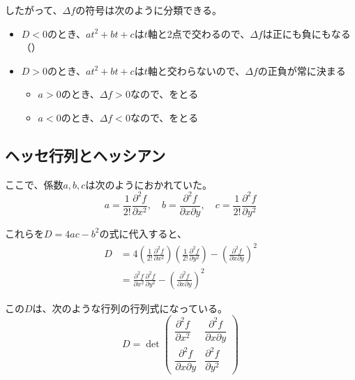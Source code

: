 \documentclass[../../../topic_calculus]{subfiles}
\begin{document}
\br

したがって、$\Delta f$の符号は次のように分類できる。
\begin{itemize}
  \item $D < 0$のとき、$at^2 + bt + c$は$t$軸と2点で交わるので、$\Delta f$は正にも負にもなる（）
  \item $D > 0$のとき、$at^2 + bt + c$は$t$軸と交わらないので、$\Delta f$の正負が常に決まる
    \begin{itemize}
      \item $a > 0$のとき、$\Delta f > 0$なので、をとる
      \item $a < 0$のとき、$\Delta f < 0$なので、をとる
    \end{itemize}
\end{itemize}

\subsection{ヘッセ行列とヘッシアン}

ここで、係数$a,b,c$は次のようにおかれていた。
\begin{equation*}
  a = \frac{1}{2!}\frac{\partial^2 f}{\partial x^2}, \quad
  b = \frac{\partial^2 f}{\partial x \partial y}, \quad
  c = \frac{1}{2!}\frac{\partial^2 f}{\partial y^2}
\end{equation*}

これらを$D = 4ac - b^2$の式に代入すると、
\begin{align*}
  D &= 4\left(\frac{1}{2!}\frac{\partial^2 f}{\partial x^2}\right)\left(\frac{1}{2!}\frac{\partial^2 f}{\partial y^2}\right) - \left(\frac{\partial^2 f}{\partial x \partial y}\right)^2 \\
  & = \frac{\partial^2 f}{\partial x^2} \frac{\partial^2 f}{\partial y^2} - \left(\frac{\partial^2 f}{\partial x \partial y}\right)^2
\end{align*}

\br

この$D$は、次のような行列の行列式になっている。
\begin{equation*}
  D = \det\begin{pmatrix}
    \dfrac{\partial^2 f}{\partial x^2} & \dfrac{\partial^2 f}{\partial x \partial y} \\
    \dfrac{\partial^2 f}{\partial x \partial y} & \dfrac{\partial^2 f}{\partial y^2}
  \end{pmatrix}
\end{equation*}
\end{document}
